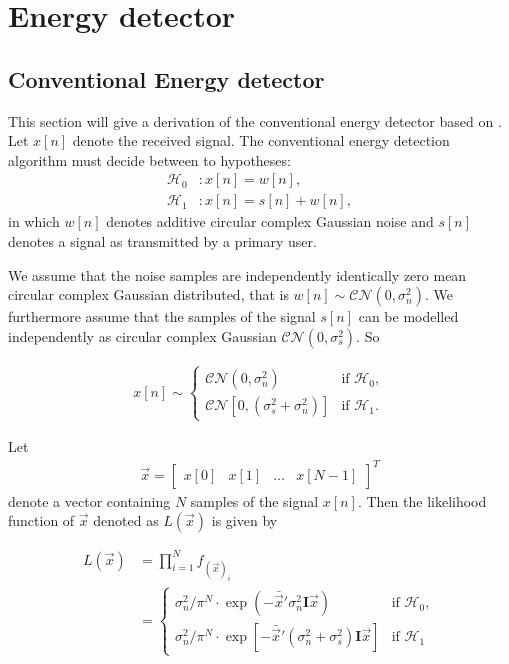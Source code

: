 \documentclass[a4paper, openany, oneside]{memoir}
\begin{document}
\section{Energy detector}

\subsection{Conventional Energy detector}\label{ssec:conv_ed_derivation}
This section will give a derivation of the conventional energy detector based on \cite{atapattu2014energy}.
Let $x[n]$ denote the received signal. The conventional energy detection algorithm must decide between to hypotheses:
\begin{align}\label{eq:hypotheses}
  \mathcal{H}_0&: x[n] = w[n],\\
  \mathcal{H}_1&: x[n] = s[n] + w[n],
\end{align}
in which $w[n]$ denotes additive circular complex Gaussian noise and $s[n]$ denotes a signal as transmitted by a primary user.

We assume that the noise samples are independently identically zero mean circular complex Gaussian distributed, that is $w[n] \sim \mathcal{CN}(0, \sigma_n^2)$. 
We furthermore assume that the samples of the signal $s[n]$ can be modelled independently as circular complex Gaussian $\mathcal{CN}(0, \sigma_s^2)$. %
So

\begin{align*}
x[n] \sim 
    \begin{cases}
        \mathcal{CN}(0, \sigma_n^2) & \text{if $\mathcal{H}_0$}, \\
        \mathcal{CN}[0, (\sigma_s^2 + \sigma_n^2)] & \text{if $\mathcal{H}_1$}.
    \end{cases}
\end{align*} 

Let
\begin{align*}
    \vec{x} = \begin{bmatrix}x[0] & x[1] & \ldots & x[N-1]\end{bmatrix}^T
\end{align*}
denote a vector containing $N$ samples of the signal $x[n]$. Then the likelihood function of $\vec{x}$ denoted as $L(\vec{x})$ is given by

\begin{align*}
    L(\vec{x}) &= \prod_{i=1}^N f_{(\vec{x})_i}\\
    &= \begin{cases}
        \sigma_n^2/\pi^N \cdot \exp(-\bar{\vec{x}}'\sigma_n^2\mathbf{I}\vec{x}) & \text{if $\mathcal{H}_0$}, \\
        \sigma_n^2/\pi^N \cdot \exp[-\bar{\vec{x}}'(\sigma_n^2+\sigma_s^2)\mathbf{I}\vec{x}] & \text{if $\mathcal{H}_1$}
    \end{cases}
\end{align*}
\end{document}

